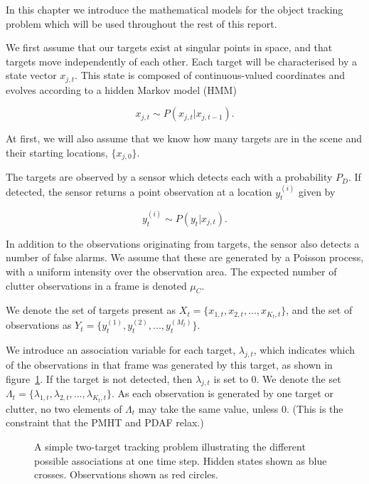 In this chapter we introduce the mathematical models for the object tracking problem which will be used throughout the rest of this report.

We first assume that our targets exist at singular points in space, and that targets move independently of each other. Each target will be characterised by a state vector $x_{j,t}$. This state is composed of continuous-valued coordinates and evolves according to a hidden Markov model (HMM)

\begin{equation}
x_{j,t} \sim P(x_{j,t}|x_{j,t-1}).
\end{equation}

At first, we will also assume that we know how many targets are in the scene and their starting locations, $\{x_{j,0}\}$.

The targets are observed by a sensor which detects each with a probability $P_D$. If detected, the sensor returns a point observation at a location $y_t^{(i)}$ given by

\begin{equation}
y_t^{(i)} \sim P(y_t|x_{j,t}).
\end{equation}

In addition to the observations originating from targets, the sensor also detects a number of false alarms. We assume that these are generated by a Poisson process, with a uniform intensity over the observation area. The expected number of clutter observations in a frame is denoted $\mu_C$.

We denote the set of targets present as $X_t = \{x_{1,t}, x_{2,t}, ... , x_{K_t, t} \}$, and the set of observations as $Y_t = \{y_t^{(1)}, y_t^{(2)}, ... , y_t^{(M_t)} \}$.

We introduce an association variable for each target, $\lambda_{j,t}$, which indicates which of the observations in that frame was generated by this target, as shown in figure~\ref{fig:BasicTrackingAssoc}. If the target is not detected, then $\lambda_{j,t}$ is set to 0. We denote the set $\Lambda_t = \{\lambda_{1,t}, \lambda_{2,t}, ... , \lambda_{K_t, t} \}$. As each observation is generated by one target or clutter, no two elements of $\Lambda_t$ may take the same value, unless 0. (This is the constraint that the PMHT and PDAF relax.)

\begin{figure} \centering
%
\caption{A simple two-target tracking problem illustrating the different possible associations at one time step. Hidden states shown as blue crosses. Observations shown as red circles.}
\label{fig:BasicTrackingAssoc}%
\end{figure}


